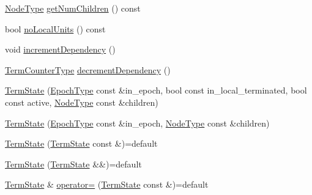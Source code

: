 \begin{DoxyCompactItemize}
\item 
\hyperlink{namespacevt_a866da9d0efc19c0a1ce79e9e492f47e2}{Node\+Type} \hyperlink{structvt_1_1term_1_1_term_state_ac3b42954f6cc609be8a40639e8a9a9a9}{get\+Num\+Children} () const
\item 
bool \hyperlink{structvt_1_1term_1_1_term_state_a6fd3b2a3c99002110ed7cfea8e30f021}{no\+Local\+Units} () const
\item 
void \hyperlink{structvt_1_1term_1_1_term_state_a109f0e5a978106ca6b8de01c5678b621}{increment\+Dependency} ()
\item 
\hyperlink{namespacevt_1_1term_a4fd378cdb0c36683afc1b3399d685f7f}{Term\+Counter\+Type} \hyperlink{structvt_1_1term_1_1_term_state_addc61edaf5b324db422a7e857890b314}{decrement\+Dependency} ()
\item 
\hyperlink{structvt_1_1term_1_1_term_state_a6949c80d5206b322eb0034ad17aa0ad0}{Term\+State} (\hyperlink{namespacevt_a985a5adf291c34a3ca263b3378388236}{Epoch\+Type} const \&in\+\_\+epoch, bool const in\+\_\+local\+\_\+terminated, bool const active, \hyperlink{namespacevt_a866da9d0efc19c0a1ce79e9e492f47e2}{Node\+Type} const \&children)
\item 
\hyperlink{structvt_1_1term_1_1_term_state_a07b3f0ad915aee5a30d526e6172f3f90}{Term\+State} (\hyperlink{namespacevt_a985a5adf291c34a3ca263b3378388236}{Epoch\+Type} const \&in\+\_\+epoch, \hyperlink{namespacevt_a866da9d0efc19c0a1ce79e9e492f47e2}{Node\+Type} const \&children)
\item 
\hyperlink{structvt_1_1term_1_1_term_state_a5a4f1285d03b0a2b1934e61bceb352c3}{Term\+State} (\hyperlink{structvt_1_1term_1_1_term_state}{Term\+State} const \&)=default
\item 
\hyperlink{structvt_1_1term_1_1_term_state_ae3b24cd9d0097422d6e1a35fc169fe4b}{Term\+State} (\hyperlink{structvt_1_1term_1_1_term_state}{Term\+State} \&\&)=default
\item 
\hyperlink{structvt_1_1term_1_1_term_state}{Term\+State} \& \hyperlink{structvt_1_1term_1_1_term_state_ac440f590ac59cb7c5b9560ca760fbc69}{operator=} (\hyperlink{structvt_1_1term_1_1_term_state}{Term\+State} const \&)=default
\end{DoxyCompactItemize}
